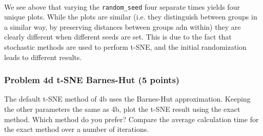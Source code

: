 \documentclass[11pt]{article}
\begin{document}
    \begin{center}
    \end{center}
    { \hspace*{\fill} \\}
    
    We see above that varying the \texttt{random\_seed} four separate times
yields four unique plots. While the plots are similar (i.e. they
distinguish between groups in a similar way, by preserving distances
between groups adn within) they are clearly different when different
seeds are set. This is due to the fact that stochastic methods are used
to perform t-SNE, and the initial randomization leads to different
results.

    \subsubsection{Problem 4d t-SNE Barnes-Hut (5
points)}\label{problem-4d-t-sne-barnes-hut-5-points}

The default t-SNE method of 4b uses the Barnes-Hut approximation.
Keeping the other parameters the same as 4b, plot the t-SNE result using
the exact method. Which method do you prefer? Compare the average
calculation time for the exact method over a number of iterations.
\end{document}
